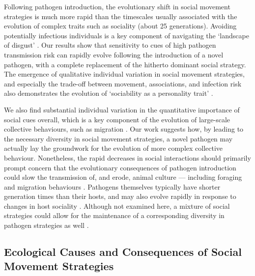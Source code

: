 Following pathogen introduction, the evolutionary shift in social movement strategies is much more rapid than the timescales usually associated with the evolution of complex traits such as sociality (about 25 generations).
Avoiding potentially infectious individuals is a key component of navigating the `landscape of disgust' \autocite{weinstein2018}.
Our results show that sensitivity to cues of high pathogen transmission risk can rapidly evolve following the introduction of a novel pathogen, with a complete replacement of the hitherto dominant social strategy.
The emergence of qualitative individual variation in social movement strategies, and especially the trade-off between movement, associations, and infection risk also demonstrates the evolution of `sociability as a personality trait' \autocite[][]{gartland2021}.

We also find substantial individual variation in the quantitative importance of social cues overall, which is a key component of the evolution of large-scale collective behaviours, such as migration \autocite{guttal2010}.
Our work suggests how, by leading to the necessary diversity in social movement strategies, a novel pathogen may actually lay the groundwork for the evolution of more complex collective behaviour.
Nonetheless, the rapid decreases in social interactions should primarily prompt concern that the evolutionary consequences of pathogen introduction could slow the transmission of, and erode, animal culture \autocite{cantor2021} --- including foraging \autocite{klump2021} and migration behaviours \autocite{jesmer2018,guttal2010}.
Pathogens themselves typically have shorter generation times than their hosts, and may also evolve rapidly in response to changes in host sociality \autocite{ashby2022}.
Although not examined here, a mixture of social strategies could allow for the maintenance of a corresponding diversity in pathogen strategies as well \autocite{ashby2022,prado2009}.

\subsection*{Ecological Causes and Consequences of Social Movement Strategies}

